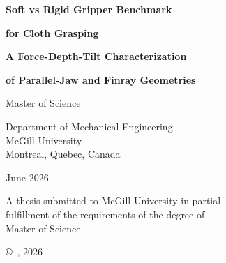 \begin{titlepage}
\begin{center}

\vspace*{0.5cm}

{\sf\bfseries\LARGE Soft vs Rigid Gripper Benchmark}

\vspace{0.15cm}

{\sf\bfseries\LARGE for Cloth Grasping}

\vspace{0.15cm}

{\sf\bfseries\Large A Force-Depth-Tilt Characterization}

\vspace{0.15cm}

{\sf\bfseries\Large of Parallel-Jaw and Finray Geometries}

\vspace{1.8cm}

{\large {}}

\vspace{1cm}

Master of Science

\vspace{1.4cm}

Department of Mechanical Engineering\\
McGill University\\
Montreal, Quebec, Canada\\

\vspace{1.5cm}

June 2026

\vspace{1.4cm}

\noindent
A thesis submitted to McGill University in partial\\
fulfillment of the requirements of the degree of\\
Master of Science

\vspace{1.4cm}

{\small \copyright\ , 2026}

\end{center}
\end{titlepage}
